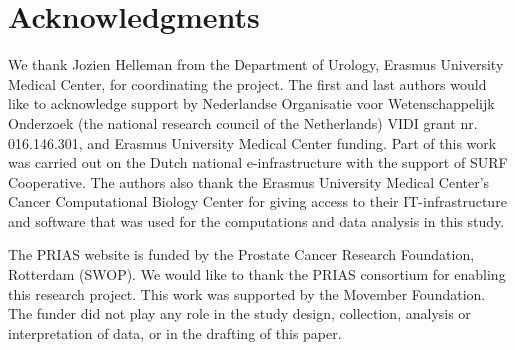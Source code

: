 \section*{Acknowledgments}
We thank Jozien Helleman from the Department of Urology, Erasmus University Medical Center, for coordinating the project. The first and last authors would like to acknowledge support by Nederlandse Organisatie voor Wetenschappelijk Onderzoek (the national research council of the Netherlands) VIDI grant nr. 016.146.301, and Erasmus University Medical Center funding. Part of this work was carried out on the Dutch national e-infrastructure with the support of SURF Cooperative. The authors also thank the Erasmus University Medical Center's Cancer Computational Biology Center for giving access to their IT-infrastructure and software that was used for the computations and data analysis in this study.

The PRIAS website is funded by the Prostate Cancer Research Foundation, Rotterdam (SWOP). We would like to thank the PRIAS consortium for enabling this research project. This work was supported by the Movember Foundation. The funder did not play any role in the study design, collection, analysis or interpretation of data, or in the drafting of this paper.